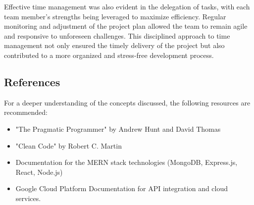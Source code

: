 Effective time management was also evident in the delegation of tasks, with each team member’s strengths being leveraged to maximize efficiency. Regular monitoring and adjustment of the project plan allowed the team to remain agile and responsive to unforeseen challenges. This disciplined approach to time management not only ensured the timely delivery of the project but also contributed to a more organized and stress-free development process.


\subsection{References}
For a deeper understanding of the concepts discussed, the following resources are recommended:
\begin{itemize}
    \item "The Pragmatic Programmer" by Andrew Hunt and David Thomas
    \item "Clean Code" by Robert C. Martin
    \item Documentation for the \gls{MERN} stack technologies (MongoDB, Express.js, React, Node.js)
    \item Google Cloud Platform Documentation for API integration and cloud services.
\end{itemize}
